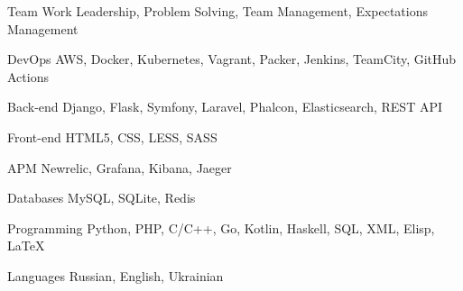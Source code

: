 
\begin{cvskills}

  \cvskill
    {Team Work}
    {Leadership, Problem Solving, Team Management, Expectations Management}

  \cvskill
    {DevOps}
    {AWS, Docker, Kubernetes, Vagrant, Packer, Jenkins, TeamCity, GitHub Actions}

  \cvskill
    {Back-end}
    {Django, Flask, Symfony, Laravel, Phalcon, Elasticsearch, REST API}

  \cvskill
    {Front-end}
    {HTML5, CSS, LESS, SASS}

  \cvskill
    {APM}
    {Newrelic, Grafana, Kibana, Jaeger}

  \cvskill
    {Databases}
    {MySQL, SQLite, Redis}

  \cvskill
    {Programming}
    {Python, PHP, C/C++, Go, Kotlin, Haskell, SQL, XML, Elisp, LaTeX}

  \cvskill
    {Languages}
    {Russian, English, Ukrainian}

\end{cvskills}
